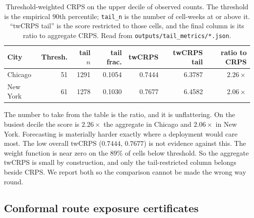 \documentclass[journal,10pt,onecolumn]{IEEEtran}
\begin{document}
\begin{table}[!t]
  \centering
  \caption{Threshold-weighted CRPS on the upper decile of observed counts. The
  threshold is the empirical $90$th percentile; \texttt{tail\_n} is the number of
  cell-weeks at or above it. ``twCRPS tail'' is the score restricted to those
  cells, and the final column is its ratio to aggregate CRPS. Read from
  \texttt{outputs/tail\_metrics/*.json}.}
  \label{tab:s-tail}
  \begin{tabular}{l r r r r r r}
    \toprule
    \textbf{City} & \textbf{Thresh.} & \textbf{tail $n$}
    & \textbf{tail frac.} & \textbf{twCRPS} & \textbf{twCRPS tail}
    & \textbf{ratio to CRPS} \\
    \midrule
    Chicago  & 51 & 1291 & 0.1054 & 0.7444 & 6.3787 & $2.26\times$ \\
    New York & 61 & 1278 & 0.1030 & 0.7677 & 6.4582 & $2.06\times$ \\
    \bottomrule
  \end{tabular}
\end{table}

The number to take from the table is the ratio, and it is unflattering. On the
busiest decile the score is $2.26\times$ the aggregate in Chicago and
$2.06\times$ in New York. Forecasting is materially harder exactly where a
deployment would care most. The low overall twCRPS ($0.7444$, $0.7677$) is not
evidence against this. The weight function is near zero on
the $89\%$ of cells below threshold. So the aggregate twCRPS is small by
construction, and only the tail-restricted column belongs beside CRPS. We report
both so the comparison cannot be made the wrong way round.

\subsection{Conformal route exposure certificates}
\label{sec:s6-exposure}
\end{document}

